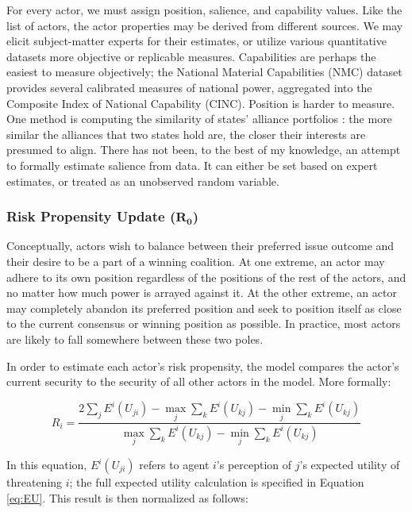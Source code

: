 For every actor, we must assign position, salience, and capability values. Like the list of actors, the actor properties may be derived from different sources. We may elicit subject-matter experts for their estimates, or utilize various quantitative datasets more objective or replicable measures. Capabilities are perhaps the easiest to measure objectively; the National Material Capabilities (NMC) dataset \citep{singer_1972,singer_1988} provides several calibrated measures of national power, aggregated into the Composite Index of National Capability (CINC). Position is harder to measure. One method is computing the similarity of states' alliance portfolios \citep{bdm_1975,bdm_1992,signorino_1999b}: the more similar the alliances that two states hold are, the closer their interests are presumed to align. There has not been, to the best of my knowledge, an attempt to formally estimate salience from data. It can either be set based on expert estimates, or treated as an unobserved random variable.


\subsubsection{Risk Propensity Update ($\mathbf{R_0}$)} \label{risk_update}

Conceptually, actors wish to balance between their preferred issue outcome and their desire to be a part of a winning coalition. At one extreme, an actor may adhere to its own position regardless of the positions of the rest of the actors, and no matter how much power is arrayed against it. At the other extreme, an actor may completely abandon its preferred position and seek to position itself as close to the current consensus or winning position as possible. In practice, most actors are likely to fall somewhere between these two poles.

In order to estimate each actor's risk propensity, the model compares the actor's current security to the security of all other actors in the model. More formally:

\begin{equation}
    R_i = \frac{ 2 \sum\limits_j E^i(U_{ji}) - \max\limits_j \sum\limits_{k} E^i(U_{kj})  -  \min\limits_j \sum\limits_{k} E^i(U_{kj})}{\max\limits_j \sum\limits_{k} E^i(U_{kj})  -  \min\limits_j \sum\limits_{k} E^i(U_{kj})} \label{eq:R_0}
\end{equation}

In this equation, $E^i(U_{ji})$ refers to agent $i$'s perception of $j$'s expected utility of threatening $i$; the full expected utility calculation is specified in Equation \ref{eq:EU}. This result is then normalized as follows:

